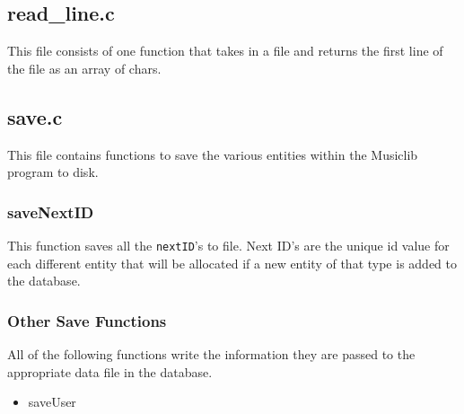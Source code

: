 \documentclass{article}
\begin{document}
\subsection{read_line.c}
This file consists of one function that takes in a file and returns the first line of the file as an array of chars.
\subsection{save.c}
This file contains functions to save the various entities within the Musiclib program to disk.
\subsubsection*{saveNextID}
This function saves all the \verb|nextID|'s to file. Next ID's are the unique id value for each different entity that will be allocated if a new entity of that type is added to the database.
\subsubsection*{Other Save Functions}
All of the following functions write the information they are passed to the appropriate data file in the database.
\begin{itemize}
\item{saveUser}
\end{itemize}
\end{document}
